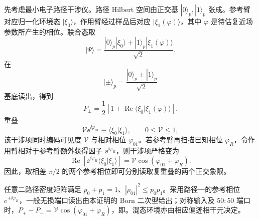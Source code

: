 \begin{proposition}
先考虑最小电子路径干涉仪。路径 Hilbert 空间由正交基 $|0\rangle_p,|1\rangle_p$ 张成。参考臂对应归一化环境态 $|\xi_0\rangle$，作用臂经过样品后对应 $|\xi_1(\varphi)\rangle$，其中 $\varphi$ 是待估复近场参数所产生的相位。联合态取
\begin{equation}
\boxed{
|\Psi\rangle
=\frac{|0\rangle_p|\xi_0\rangle
+|1\rangle_p|\xi_1(\varphi)\rangle}{\sqrt2}.}
\label{eq:path_environment_joint_state_dp68}
\end{equation}
在
\[
|\pm\rangle_p
=\frac{|0\rangle_p\pm|1\rangle_p}{\sqrt2}
\]
基底读出，得到
\begin{equation}
\boxed{
P_\pm
=\frac12\left[
1\pm\operatorname{Re}
\langle\xi_0|\xi_1(\varphi)\rangle
\right].}
\label{eq:path-phase-readout-dp19}
\end{equation}
重叠
\[
\mathcal V\ee^{\ii\varphi_{01}}
\equiv\langle\xi_0|\xi_1\rangle,
\qquad 0\le\mathcal V\le1,
\]
该干涉项同时编码可见度 $\mathcal V$ 与相对相位 $\varphi_{01}$。若参考臂再扫描已知相位 $\varphi_R$，令作用臂相对于参考臂额外获得因子 $\ee^{\ii\varphi_R}$，则干涉项严格变为
\[
\operatorname{Re}\!\left[\ee^{\ii\varphi_R}\langle\xi_0|\xi_1\rangle\right]
=\mathcal V\cos(\varphi_{01}+\varphi_R).
\]
因此，取相差 $\pi/2$ 的两个参考相位即可分别读取复重叠的两个正交象限。



任意二路径密度矩阵满足 $p_0+p_1=1$、$|\rho_{01}|^2\le p_0p_1$。采用路径一的参考相位 $e^{+\ii\varphi_R}$，一般无损端口读出由本证明的 Born 二次型给出；对称输入及 $50{:}50$ 端口时，$P_+-P_-=\mathcal V\cos(\varphi_{01}+\varphi_R)$，即。混态环境亦由相应偏迹相干元决定。
\end{proposition}
